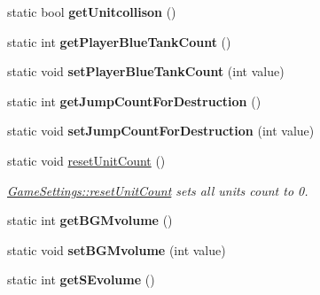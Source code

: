 \begin{DoxyCompactItemize}
\item 
static bool {\bfseries get\+Unitcollison} ()\hypertarget{class_game_settings_aeac78896ad8aac55d54e36452ed226c8}{}\label{class_game_settings_aeac78896ad8aac55d54e36452ed226c8}

\item 
static int {\bfseries get\+Player\+Blue\+Tank\+Count} ()\hypertarget{class_game_settings_a9934653147ad149f51cf0e3489be961a}{}\label{class_game_settings_a9934653147ad149f51cf0e3489be961a}

\item 
static void {\bfseries set\+Player\+Blue\+Tank\+Count} (int value)\hypertarget{class_game_settings_a3e0545d4fafb4af1a3bad7a5a2a474c9}{}\label{class_game_settings_a3e0545d4fafb4af1a3bad7a5a2a474c9}

\item 
static int {\bfseries get\+Jump\+Count\+For\+Destruction} ()\hypertarget{class_game_settings_a8f51a84a9cf7a93e00d07643974f55fb}{}\label{class_game_settings_a8f51a84a9cf7a93e00d07643974f55fb}

\item 
static void {\bfseries set\+Jump\+Count\+For\+Destruction} (int value)\hypertarget{class_game_settings_a884cbe017c236889d509e36d2f6a4f8b}{}\label{class_game_settings_a884cbe017c236889d509e36d2f6a4f8b}

\item 
static void \hyperlink{class_game_settings_a9ad65a0b954336d45ffb816af6cb9884}{reset\+Unit\+Count} ()\hypertarget{class_game_settings_a9ad65a0b954336d45ffb816af6cb9884}{}\label{class_game_settings_a9ad65a0b954336d45ffb816af6cb9884}

\begin{DoxyCompactList}\small\item\em \hyperlink{class_game_settings_a9ad65a0b954336d45ffb816af6cb9884}{Game\+Settings\+::reset\+Unit\+Count} sets all units count to 0. \end{DoxyCompactList}\item 
static int {\bfseries get\+B\+G\+Mvolume} ()\hypertarget{class_game_settings_a40fc00cb65266e231bd8fa17b42ef856}{}\label{class_game_settings_a40fc00cb65266e231bd8fa17b42ef856}

\item 
static void {\bfseries set\+B\+G\+Mvolume} (int value)\hypertarget{class_game_settings_a3eec97d0e385076fe812db30c966a7bf}{}\label{class_game_settings_a3eec97d0e385076fe812db30c966a7bf}

\item 
static int {\bfseries get\+S\+Evolume} ()\hypertarget{class_game_settings_ad762c594c185042c4b31a21691cc757e}{}\label{class_game_settings_ad762c594c185042c4b31a21691cc757e}


\end{DoxyCompactItemize}
